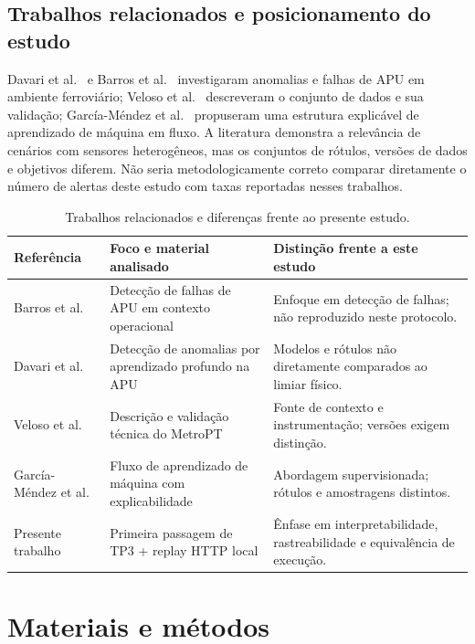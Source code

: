 \documentclass[conference]{IEEEtran}
\begin{document}
\subsection{Trabalhos relacionados e posicionamento do estudo}

Davari et al.~\cite{davari2021predictive} e Barros et al.~\cite{barros2020failure} investigaram anomalias e falhas de APU em ambiente ferroviário; Veloso et al.~\cite{veloso2022metropt} descreveram o conjunto de dados e sua validação; García-Méndez et al.~\cite{garciamendez2025explainable} propuseram uma estrutura explicável de aprendizado de máquina em fluxo. A literatura demonstra a relevância de cenários com sensores heterogêneos, mas os conjuntos de rótulos, versões de dados e objetivos diferem. Não seria metodologicamente correto comparar diretamente o número de alertas deste estudo com taxas reportadas nesses trabalhos.

\begin{table}[!t]
\centering
\footnotesize
\setlength{\tabcolsep}{4pt}
\renewcommand{\arraystretch}{1.15}
\caption{Trabalhos relacionados e diferenças frente ao presente estudo.}
\label{tab:0}
\begin{tabularx}{\textwidth}{@{}p{}p{}X@{}}
\toprule
\textbf{Referência} & \textbf{Foco e material analisado} & \textbf{Distinção frente a este estudo} \\
\midrule
Barros et al.~\cite{barros2020failure} & Detecção de falhas de APU em contexto operacional & Enfoque em detecção de falhas; não reproduzido neste protocolo. \\
Davari et al.~\cite{davari2021predictive} & Detecção de anomalias por aprendizado profundo na APU & Modelos e rótulos não diretamente comparados ao limiar físico. \\
Veloso et al.~\cite{veloso2022metropt} & Descrição e validação técnica do MetroPT & Fonte de contexto e instrumentação; versões exigem distinção. \\
García-Méndez et al.~\cite{garciamendez2025explainable} & Fluxo de aprendizado de máquina com explicabilidade & Abordagem supervisionada; rótulos e amostragens distintos. \\
Presente trabalho & Primeira passagem de TP3 + replay HTTP local & Ênfase em interpretabilidade, rastreabilidade e equivalência de execução. \\
\bottomrule
\end{tabularx}
\end{table}

\section{Materiais e métodos}
\end{document}
